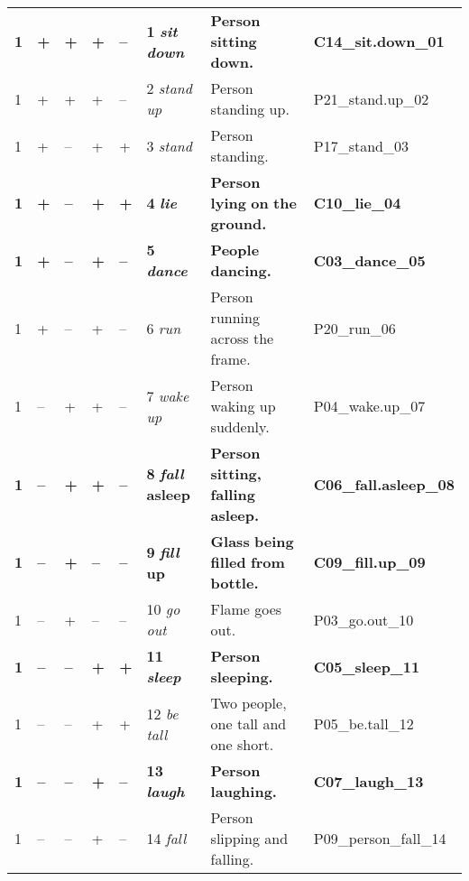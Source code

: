 \begin{tabular}{llllllp{3cm}l}
\midrule
\textbf{1} 	& \textbf{+} 	& \textbf{+} 	& \textbf{+} 	& \textbf{--} 	& \textbf{1} 	\textbf{\textit{sit down}}& \textbf{Person} \textbf{sitting} \textbf{down.} 	& \textbf{C14\_sit.down\_01} \\
1 		& + 		& + 		& + 		& -- 		& 2 		\textit{stand up}& Person standing up. 						& P21\_stand.up\_02  \\
1 		& + 		& -- 		& + 		& + 		& 3 		\textit{stand}&Person standing.				& P17\_stand\_03  \\
\textbf{1} 	& \textbf{+} 	& \textbf{--} & \textbf{+} 	& \textbf{+} & \textbf{4} 	\textbf{\textit{lie}}& \textbf{Person} \textbf{lying} \textbf{on} \textbf{the} \textbf{ground.} & \textbf{C10\_lie\_04}  \\
\textbf{1} 	& \textbf{+} 	& \textbf{--} & \textbf{+} 	& \textbf{--} 	& \textbf{5} 	\textbf{\textit{dance}}&\textbf{People} \textbf{dancing.} & \textbf{C03\_dance\_05} \\
1 		& + 		& -- 		& + 		& -- 		& 6 		\textit{run}& Person running across the frame.					&  P20\_run\_06  \\
1 		& -- 	& + 		& + 		& -- 		& 7 		\textit{wake up}& Person waking up suddenly.					&  P04\_wake.up\_07  \\
\textbf{1} 	& \textbf{--}& \textbf{+} & \textbf{+} 	& \textbf{--} 	& \textbf{8} 	\textbf{\textit{fall} \textbf{asleep}}& \textbf{Person} \textbf{sitting,} \textbf{falling} \textbf{asleep.}&  \textbf{C06\_fall.asleep\_08}  \\
\textbf{1} 	& \textbf{--}& \textbf{+} & \textbf{--}& \textbf{--} 	& \textbf{9} 	\textbf{\textit{fill} \textbf{up}}& \textbf{Glass} \textbf{being} \textbf{filled} \textbf{from} \textbf{bottle.} & \textbf{C09\_fill.up\_09} \\
1 		& -- 	& + 		& --		& -- 		& 10 		\textit{go out}& Flame goes out. 						& P03\_go.out\_10  \\
\textbf{1} 	& \textbf{--}& \textbf{--} & \textbf{+} & \textbf{+} & \textbf{11} 	\textbf{\textit{sleep}}& \textbf{Person} \textbf{sleeping.} 			& \textbf{C05\_sleep\_11} \\
1 		& -- 	& -- 		& + 		& + 		& 12 		\textit{be tall}& Two people, one tall and one short. 				& P05\_be.tall\_12 \\
\textbf{1} 	& \textbf{--}& \textbf{--} & \textbf{+} & \textbf{--} 	& \textbf{13} 	\textbf{\textit{laugh}}& \textbf{Person} \textbf{laughing.}			 & \textbf{C07\_laugh\_13} \\
1 		& -- 	& -- 		& + 		& -- 		& 14 		\textit{fall}& Person slipping and falling. 					& P09\_person\_fall\_14 \\

\end{tabular}
